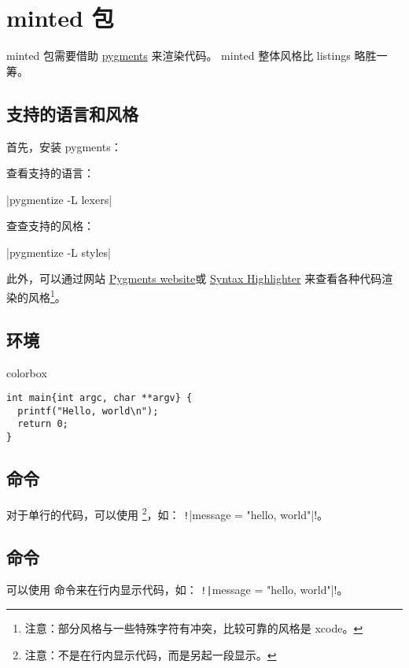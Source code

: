 \section{minted 包}

minted 包需要借助 \href{https://pygments.org/}{pygments} 来渲染代码。
minted 整体风格比 listings 略胜一筹。

\subsection{支持的语言和风格}

首先，安装 pygments：


查看支持的语言：

|pygmentize -L lexers|

查查支持的风格：

|pygmentize -L styles|

此外，可以通过网站
\href{https://pygments.org/demo/}{Pygments website}或
\href{https://thepythonguru.com/tools/pygments-demo/}{Syntax Highlighter}
来查看各种代码渲染的风格\footnote{注意：部分风格与一些特殊字符有冲突，比较可靠的风格是 xcode。}。

\subsection{\protect{} 环境}

\begin{latexcode}{colorbox}
\begin{verbatim}
int main{int argc, char **argv} {
  printf("Hello, world\n");
  return 0;
}
\end{verbatim}
\end{latexcode}

\subsection{\protect{} 命令}

对于单行的代码，可以使用 
\footnote{注意：不是在行内显示代码，而是另起一段显示。}，如：
\texttt!|message = "hello, world"|!。

\subsection{\protect{} 命令}

可以使用  命令来在行内显示代码，如：
\texttt!\texttt|message = "hello, world"|!。

